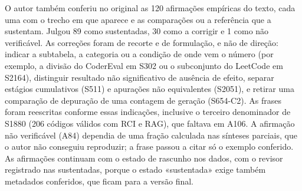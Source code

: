 O autor também conferiu no original as 120 afirmações empíricas do texto, cada uma com o trecho em que aparece e as
comparações ou a referência que a sustentam. Julgou 89 como sustentadas, 30 como a corrigir e 1 como não
verificável. As correções foram de recorte e de formulação, e não de direção: indicar a subtabela, a categoria ou a
condição de onde vem o número (por exemplo, a divisão do CoderEval em S302 ou o subconjunto do LeetCode em S2164),
distinguir resultado não significativo de ausência de efeito, separar estágios cumulativos (S511) e apurações não
equivalentes (S2051), e retirar uma comparação de depuração de uma contagem de geração (S654-C2). As frases foram reescritas conforme essas indicações,
inclusive o terceiro denominador de S1880 (206 códigos válidos com RCI e RAG), que faltava em A106. A afirmação não verificável (A84) dependia de uma fração calculada nas
sínteses parciais, que o autor não conseguiu reproduzir; a frase passou a citar só o exemplo conferido.
As afirmações continuam com o estado de rascunho nos dados, com o revisor registrado nas sustentadas, porque o estado
«sustentada» exige também metadados conferidos, que ficam para a versão final.
